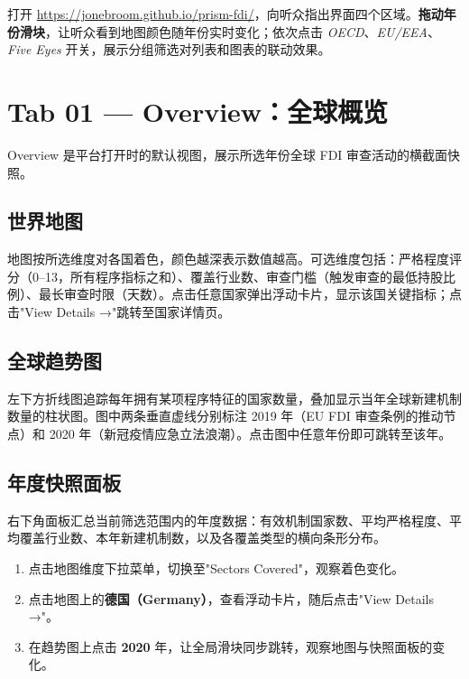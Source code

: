 \documentclass[12pt,a4paper]{article}
\newcommand{\uielem}[1]{\textit{#1}}
\begin{document}
\begin{demobox}
  打开 \url{https://jonebroom.github.io/prism-fdi/}，向听众指出界面四个区域。\textbf{拖动年份滑块}，让听众看到地图颜色随年份实时变化；依次点击 \uielem{OECD}、\uielem{EU/EEA}、\uielem{Five Eyes} 开关，展示分组筛选对列表和图表的联动效果。
\end{demobox}

\section{Tab 01 — Overview：全球概览}

Overview 是平台打开时的默认视图，展示所选年份全球 FDI 审查活动的横截面快照。

\subsection{世界地图}

地图按所选维度对各国着色，颜色越深表示数值越高。可选维度包括：严格程度评分（0–13，所有程序指标之和）、覆盖行业数、审查门槛（触发审查的最低持股比例）、最长审查时限（天数）。点击任意国家弹出浮动卡片，显示该国关键指标；点击"View Details →"跳转至国家详情页。

\subsection{全球趋势图}

左下方折线图追踪每年拥有某项程序特征的国家数量，叠加显示当年全球新建机制数量的柱状图。图中两条垂直虚线分别标注 2019 年（EU FDI 审查条例的推动节点）和 2020 年（新冠疫情应急立法浪潮）。点击图中任意年份即可跳转至该年。

\subsection{年度快照面板}

右下角面板汇总当前筛选范围内的年度数据：有效机制国家数、平均严格程度、平均覆盖行业数、本年新建机制数，以及各覆盖类型的横向条形分布。

\begin{demobox}
  \begin{enumerate}
    \item 点击地图维度下拉菜单，切换至"Sectors Covered"，观察着色变化。
    \item 点击地图上的\textbf{德国（Germany）}，查看浮动卡片，随后点击"View Details →"。
    \item 在趋势图上点击 \textbf{2020} 年，让全局滑块同步跳转，观察地图与快照面板的变化。
  \end{enumerate}
\end{demobox}
\end{document}
